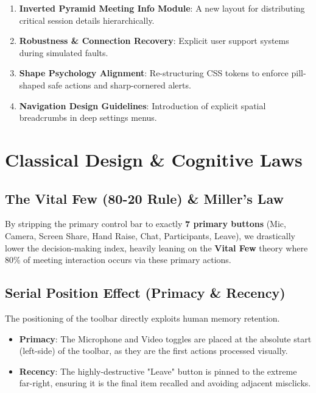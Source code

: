 \documentclass[12pt,a4paper]{article}
\begin{document}
\begin{enumerate}
    \item \textbf{Inverted Pyramid Meeting Info Module}: A new layout for distributing critical session details hierarchically.
    \item \textbf{Robustness \& Connection Recovery}: Explicit user support systems during simulated faults.
    \item \textbf{Shape Psychology Alignment}: Re-structuring CSS tokens to enforce pill-shaped safe actions and sharp-cornered alerts.
    \item \textbf{Navigation Design Guidelines}: Introduction of explicit spatial breadcrumbs in deep settings menus.
\end{enumerate}

\section{Classical Design \& Cognitive Laws}

\subsection{The Vital Few (80-20 Rule) \& Miller's Law}
By stripping the primary control bar to exactly \textbf{7 primary buttons} (Mic, Camera, Screen Share, Hand Raise, Chat, Participants, Leave), we drastically lower the decision-making index, heavily leaning on the \textbf{Vital Few} theory where 80\% of meeting interaction occurs via these primary actions.

\subsection{Serial Position Effect (Primacy \& Recency)}
The positioning of the toolbar directly exploits human memory retention. 
\begin{itemize}
    \item \textbf{Primacy}: The Microphone and Video toggles are placed at the absolute start (left-side) of the toolbar, as they are the first actions processed visually.
    \item \textbf{Recency}: The highly-destructive "Leave" button is pinned to the extreme far-right, ensuring it is the final item recalled and avoiding adjacent misclicks.
\end{itemize}
\end{document}
